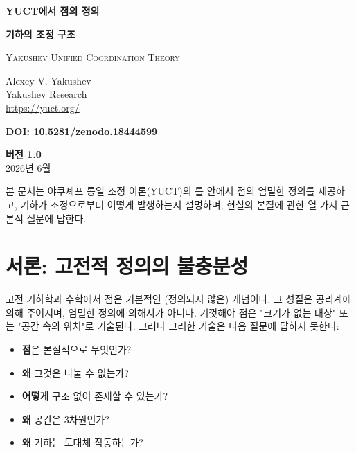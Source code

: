 \documentclass[12pt,a4paper]{article}
\begin{document}
	
	\begin{titlepage}
		\begin{center}
			\vspace*{1.5cm}
			\Huge\textbf{YUCT에서 점의 정의}
			
			\vspace{0.3cm}
			\Large\textbf{기하의 조정 구조}
			
			\vspace{0.5cm}
			\large
			\textsc{Yakushev Unified Coordination Theory}
			
			\vspace{0.8cm}
			\large
			Alexey V. Yakushev \\
			Yakushev Research \\
			\url{https://yuct.org/}
			
			\vspace{0.5cm}
			\large
			\textbf{DOI: \href{https://doi.org/10.5281/zenodo.18444599}{10.5281/zenodo.18444599}}
			
			\vspace{1.5cm}
			\large
			\textbf{버전 1.0} \\
			2026년 6월
			
			\vfill
			\normalsize
			본 문서는 야쿠셰프 통일 조정 이론(YUCT)의 틀 안에서 점의 엄밀한 정의를 제공하고,
			기하가 조정으로부터 어떻게 발생하는지 설명하며, 현실의 본질에 관한 열 가지 근본적 질문에 답한다.
		\end{center}
	\end{titlepage}
	
	\tableofcontents
	\newpage
	
	\section{서론: 고전적 정의의 불충분성}
	
	고전 기하학과 수학에서 점은 기본적인 (정의되지 않은) 개념이다. 그 성질은 공리계에 의해 주어지며, 엄밀한 정의에 의해서가 아니다. 기껏해야 점은 "크기가 없는 대상" 또는 "공간 속의 위치"로 기술된다. 그러나 그러한 기술은 다음 질문에 답하지 못한다:
	
	\begin{itemize}
		\item \textbf{점}은 본질적으로 무엇인가?
		\item \textbf{왜} 그것은 나눌 수 없는가?
		\item \textbf{어떻게} 구조 없이 존재할 수 있는가?
		\item \textbf{왜} 공간은 3차원인가?
		\item \textbf{왜} 기하는 도대체 작동하는가?
	\end{itemize}
	
\end{document}
